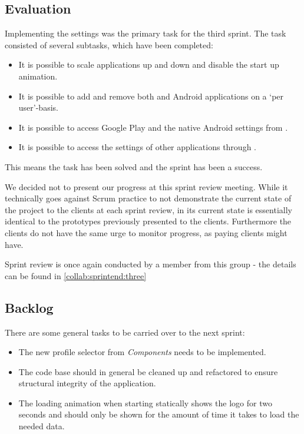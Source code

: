 \subsection{Evaluation}
Implementing the settings was the primary task for the third sprint.
The task consisted of several subtasks, which have been completed:

\begin{itemize}
\item It is possible to scale applications up and down and disable the start up animation.
\item It is possible to add and remove both \giraf and Android applications on a `per user'-basis.
\item It is possible to access Google Play and the native Android settings from \settingsactivity.
\item It is possible to access the settings of other \giraf applications through \settingsactivity.
\end{itemize}

This means the task has been solved and the sprint has been a success. 

We decided not to present our progress at this sprint review meeting. 
While it technically goes against Scrum practice to not demonstrate the current state of the project to the clients at each sprint review, \settingsactivity in its current state is essentially identical to the prototypes previously presented to the clients.
Furthermore the clients do not have the same urge to monitor progress, as paying clients might have.

Sprint review is once again conducted by a member from this group - the details can be found in \cref{collab:sprintend:three}

\subsection{Backlog}

There are some general tasks to be carried over to the next sprint:

\begin{itemize}
\item The new profile selector from \textit{\giraf Components} needs to be implemented.
\item The code base should in general be cleaned up and refactored to ensure structural integrity of the application.
\item The loading animation when starting \launcher statically shows the logo for two seconds and should only be shown for the amount of time it takes to load the needed data.
\end{itemize}

